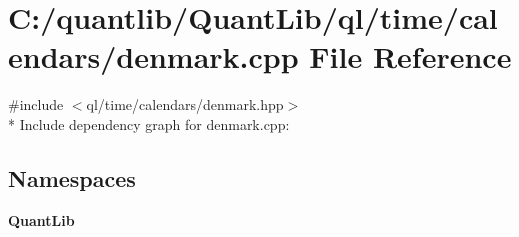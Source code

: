 \section{C\+:/quantlib/\+Quant\+Lib/ql/time/calendars/denmark.cpp File Reference}
\label{denmark_8cpp}
{\ttfamily \#include $<$ql/time/calendars/denmark.\+hpp$>$}\\*
Include dependency graph for denmark.\+cpp\+:
\subsection*{Namespaces}
\begin{DoxyCompactItemize}
\item 
 {\bf Quant\+Lib}
\end{DoxyCompactItemize}
